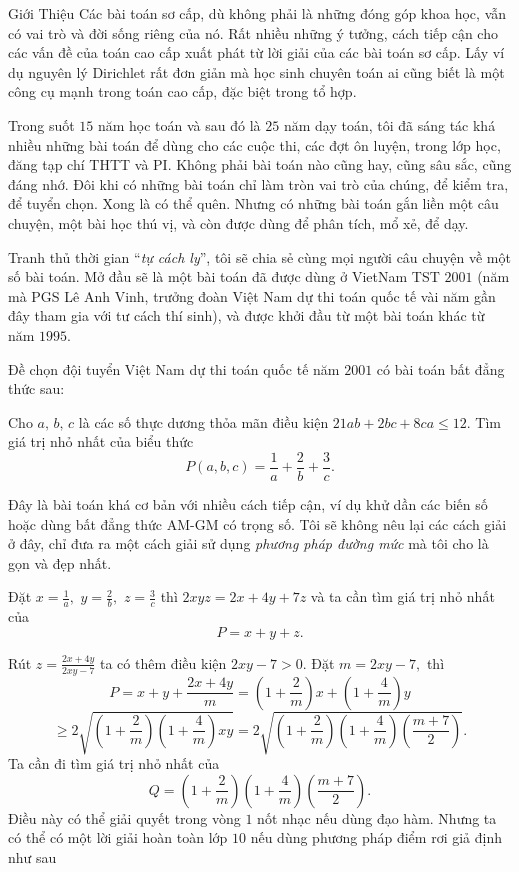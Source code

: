 \documentclass[12pt,a4paper]{book}
\begin{document}

\begin{newAbstract}{Giới Thiệu}
Các bài toán sơ cấp, dù không phải là những đóng góp khoa học, vẫn có vai trò và đời sống riêng của nó. Rất nhiều những ý tưởng, cách tiếp cận cho các vấn đề của toán cao cấp xuất phát từ lời giải của các bài toán sơ cấp. Lấy ví dụ nguyên lý Dirichlet rất đơn giản mà học sinh chuyên toán ai cũng biết là một công cụ mạnh trong toán cao cấp, đặc biệt trong tổ hợp.

Trong suốt $15$ năm học toán và sau đó là $25$ năm dạy toán, tôi đã sáng tác khá nhiều những bài toán để dùng cho các cuộc thi, các đợt ôn luyện, trong lớp học, đăng tạp chí THTT và PI. Không phải bài toán nào cũng hay, cũng sâu sắc, cũng đáng nhớ. Đôi khi có những bài toán chỉ làm tròn vai trò của chúng, để kiểm tra, để tuyển chọn. Xong là có thể quên. Nhưng có những bài toán gắn liền một câu chuyện, một bài học thú vị, và còn được dùng để phân tích, mổ xẻ, để dạy.

Tranh thủ thời gian “\textit{tự cách ly}”, tôi sẽ chia sẻ cùng mọi người câu chuyện về một số bài toán. Mở đầu sẽ là một bài toán đã được dùng ở VietNam TST $2001$ (năm mà PGS Lê Anh Vinh, trưởng đoàn Việt Nam dự thi toán quốc tế vài năm gần đây tham gia với tư cách thí sinh), và được khởi đầu từ một bài toán khác từ năm $1995.$
\end{newAbstract}

Đề chọn đội tuyển Việt Nam dự thi toán quốc tế năm $2001$ có bài toán bất đẳng thức sau:

\begin{bt}
Cho $a,\,b,\,c$ là các số thực dương thỏa mãn điều kiện $21ab+2bc+8ca \leq 12.$ Tìm giá trị nhỏ nhất của biểu thức $$P(a, b, c)=\frac{1}{a}+\frac{2}{b}+\frac{3}{c}.$$
\end{bt}

Đây là bài toán khá cơ bản với nhiều cách tiếp cận, ví dụ khử dần các biến số hoặc dùng bất đẳng thức AM-GM có trọng số. Tôi sẽ không nêu lại các cách giải ở đây, chỉ đưa ra một cách giải sử dụng \textit{phương pháp đường mức} mà tôi cho là gọn và đẹp nhất.

Đặt $x=\frac{1}{a},$ $y=\frac{2}{b},$ $z=\frac{3}{c}$ thì $2 xyz =2x+4y+7z$ và ta cần tìm giá trị nhỏ nhất của $$P=x+y+z.$$

Rút $z=\frac{2 x+4 y}{2 x y-7}$ ta có thêm điều kiện $2 x y-7>0 .$ Đặt $m=2x y-7,$ thì
$$P=x+y+\frac{2 x+4 y}{m}=\left(1+\frac{2}{m}\right) x+\left(1+\frac{4}{m}\right) y $$
$$\geq 2 \sqrt{\left(1+\frac{2}{m}\right)\left(1+\frac{4}{m}\right) x y}=2 \sqrt{\left(1+\frac{2}{m}\right)\left(1+\frac{4}{m}\right)\left(\frac{m+7}{2}\right)}.$$
Ta cần đi tìm giá trị nhỏ nhất của $$Q=\left(1+\frac{2}{m}\right)\left(1+\frac{4}{m}\right)\left(\frac{m+7}{2}\right) .$$ Điều này có thể giải quyết trong vòng $1$ nốt nhạc nếu dùng đạo hàm. Nhưng ta có thể có một lời giải hoàn toàn lớp $10$ nếu dùng phương pháp điểm rơi giả định như sau
\end{document}
